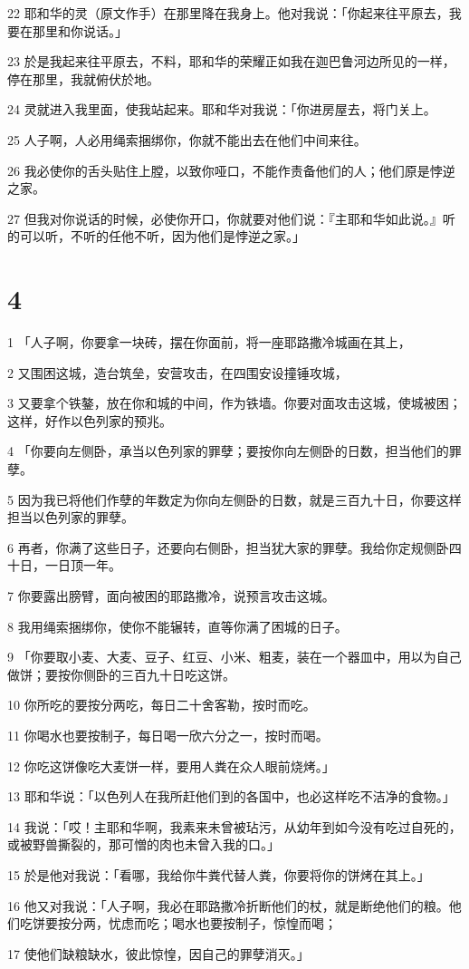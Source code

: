 \par 22 耶和华的灵（原文作手）在那里降在我身上。他对我说：「你起来往平原去，我要在那里和你说话。」
\par 23 於是我起来往平原去，不料，耶和华的荣耀正如我在迦巴鲁河边所见的一样，停在那里，我就俯伏於地。
\par 24 灵就进入我里面，使我站起来。耶和华对我说：「你进房屋去，将门关上。
\par 25 人子啊，人必用绳索捆绑你，你就不能出去在他们中间来往。
\par 26 我必使你的舌头贴住上膛，以致你哑口，不能作责备他们的人；他们原是悖逆之家。
\par 27 但我对你说话的时候，必使你开口，你就要对他们说：『主耶和华如此说。』听的可以听，不听的任他不听，因为他们是悖逆之家。」

\chapter{4}

\par 1 「人子啊，你要拿一块砖，摆在你面前，将一座耶路撒冷城画在其上，
\par 2 又围困这城，造台筑垒，安营攻击，在四围安设撞锤攻城，
\par 3 又要拿个铁鏊，放在你和城的中间，作为铁墙。你要对面攻击这城，使城被困；这样，好作以色列家的预兆。
\par 4 「你要向左侧卧，承当以色列家的罪孽；要按你向左侧卧的日数，担当他们的罪孽。
\par 5 因为我已将他们作孽的年数定为你向左侧卧的日数，就是三百九十日，你要这样担当以色列家的罪孽。
\par 6 再者，你满了这些日子，还要向右侧卧，担当犹大家的罪孽。我给你定规侧卧四十日，一日顶一年。
\par 7 你要露出膀臂，面向被困的耶路撒冷，说预言攻击这城。
\par 8 我用绳索捆绑你，使你不能辗转，直等你满了困城的日子。
\par 9 「你要取小麦、大麦、豆子、红豆、小米、粗麦，装在一个器皿中，用以为自己做饼；要按你侧卧的三百九十日吃这饼。
\par 10 你所吃的要按分两吃，每日二十舍客勒，按时而吃。
\par 11 你喝水也要按制子，每日喝一欣六分之一，按时而喝。
\par 12 你吃这饼像吃大麦饼一样，要用人粪在众人眼前烧烤。」
\par 13 耶和华说：「以色列人在我所赶他们到的各国中，也必这样吃不洁净的食物。」
\par 14 我说：「哎！主耶和华啊，我素来未曾被玷污，从幼年到如今没有吃过自死的，或被野兽撕裂的，那可憎的肉也未曾入我的口。」
\par 15 於是他对我说：「看哪，我给你牛粪代替人粪，你要将你的饼烤在其上。」
\par 16 他又对我说：「人子啊，我必在耶路撒冷折断他们的杖，就是断绝他们的粮。他们吃饼要按分两，忧虑而吃；喝水也要按制子，惊惶而喝；
\par 17 使他们缺粮缺水，彼此惊惶，因自己的罪孽消灭。」

